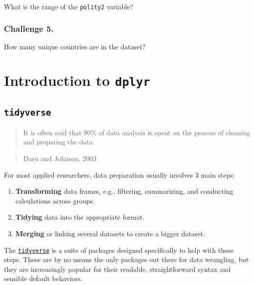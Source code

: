\documentclass[
]{book}
\providecommand{\tightlist}{%
  \setlength{\itemsep}{0pt}\setlength{\parskip}{0pt}}
\begin{document}
What is the range of the \texttt{polity2} variable?

\hypertarget{challenge-5.}{%
\subsubsection*{Challenge 5.}\label{challenge-5.}}

How many unique countries are in the dataset?

\hypertarget{introduction-to-dplyr}{%
\section{\texorpdfstring{Introduction to \texttt{dplyr}}{Introduction to dplyr}}\label{introduction-to-dplyr}}

\hypertarget{tidyverse}{%
\subsection{\texorpdfstring{\texttt{tidyverse}}{tidyverse}}\label{tidyverse}}

\begin{quote}
It is often said that 80\% of data analysis is spent on the process of cleaning and preparing the data.
\end{quote}

\begin{quote}
Dasu and Johnson, 2003
\end{quote}

For most applied researchers, data preparation usually involves 3 main steps:

\begin{enumerate}
\def\labelenumi{\arabic{enumi}.}
\tightlist
\item
  \textbf{Transforming} data frames, e.g., filtering, summarizing, and conducting calculations across groups.
\item
  \textbf{Tidying} data into the appropriate format.
\item
  \textbf{Merging} or linking several datasets to create a bigger dataset.
\end{enumerate}

The \href{https://www.tidyverse.org/}{\texttt{tidyverse}} is a suite of packages designed specifically to help with these steps. These are by no means the only packages out there for data wrangling, but they are increasingly popular for their readable, straightforward syntax and sensible default behaviors.
\end{document}
